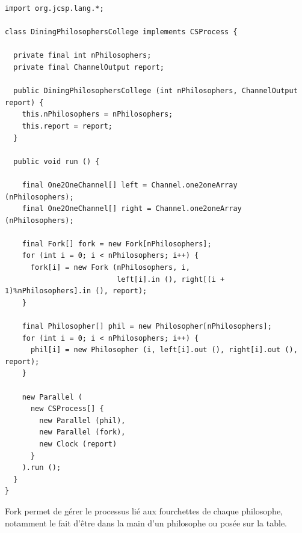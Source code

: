\documentclass[a4paper,11pt,french]{report}
\begin{document}
\begin{lstlisting}[frame=trBL,title={Dîner des philosophes : DiningPhilosophersCollege.java}]
import org.jcsp.lang.*;

class DiningPhilosophersCollege implements CSProcess {

  private final int nPhilosophers;
  private final ChannelOutput report;

  public DiningPhilosophersCollege (int nPhilosophers, ChannelOutput report) {
    this.nPhilosophers = nPhilosophers;
    this.report = report;
  }

  public void run () {

    final One2OneChannel[] left = Channel.one2oneArray (nPhilosophers);
    final One2OneChannel[] right = Channel.one2oneArray (nPhilosophers);

    final Fork[] fork = new Fork[nPhilosophers];
    for (int i = 0; i < nPhilosophers; i++) {
      fork[i] = new Fork (nPhilosophers, i,
                          left[i].in (), right[(i + 1)%nPhilosophers].in (), report);
    }

    final Philosopher[] phil = new Philosopher[nPhilosophers];
    for (int i = 0; i < nPhilosophers; i++) {
      phil[i] = new Philosopher (i, left[i].out (), right[i].out (), report);
    }

    new Parallel (
      new CSProcess[] {
        new Parallel (phil),
        new Parallel (fork),
        new Clock (report)
      }
    ).run ();
  }
}
\end{lstlisting}

Fork permet de gérer le processus lié aux fourchettes de chaque philosophe, notamment le fait d'être dans la main d'un philosophe ou posée sur la table.
\end{document}
